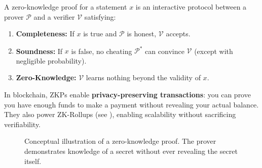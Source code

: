 \begin{definition}
\label{def:zkp}
A zero-knowledge proof for a statement $x$ is an interactive protocol between a prover $\mathcal{P}$ and a verifier $\mathcal{V}$ satisfying:
\begin{enumerate}
    \item \textbf{Completeness:} If $x$ is true and $\mathcal{P}$ is honest, $\mathcal{V}$ accepts.
    \item \textbf{Soundness:} If $x$ is false, no cheating $\mathcal{P}^*$ can convince $\mathcal{V}$ (except with negligible probability).
    \item \textbf{Zero-Knowledge:} $\mathcal{V}$ learns nothing beyond the validity of $x$.
\end{enumerate}
\end{definition}

In blockchain, ZKPs enable \textbf{privacy-preserving transactions}: you can prove you have enough funds to make a payment without revealing your actual balance. They also power ZK-Rollups (see ), enabling scalability without sacrificing verifiability.

\begin{figure}[htbp]
\centering
{}
\caption{Conceptual illustration of a zero-knowledge proof. The prover demonstrates knowledge of a secret without ever revealing the secret itself.}
\label{fig:zkp}
\end{figure}

